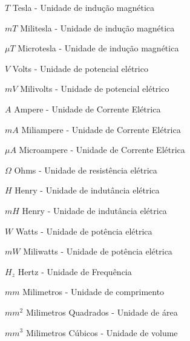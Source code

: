\documentclass{ifscTCC} %
\begin{document}
\begin{simbolos}
   \item[$T$] Tesla - Unidade de indução magnética
   \item[$mT$] Militesla - Unidade de indução magnética
   \item[$\mu T$] Microtesla - Unidade de indução magnética
   \item[$V$] Volts - Unidade de potencial elétrico
   \item[$mV$] Milivolts - Unidade de potencial elétrico
   \item[$A$] Ampere - Unidade de Corrente Elétrica
   \item[$mA$] Miliampere - Unidade de Corrente Elétrica
   \item[$\mu A$] Microampere - Unidade de Corrente Elétrica
   \item[$\Omega$] Ohms - Unidade de resistência elétrica
   \item[$H$] Henry - Unidade de indutância elétrica
   \item[$mH$] Henry - Unidade de indutância elétrica
   \item[$W$] Watts - Unidade de potência elétrica
   \item[$mW$] Miliwatts - Unidade de potência elétrica
   \item[$H_z$] Hertz - Unidade de Frequência 
   \item[$mm$] Milimetros - Unidade de comprimento 
   \item[$mm^{2}$] Milimetros Quadrados - Unidade de área
   \item[$mm^{3}$] Milimetros Cúbicos - Unidade de volume
\end{simbolos}

\tableofcontents*
\cleardoublepage

\textual

\end{document}
